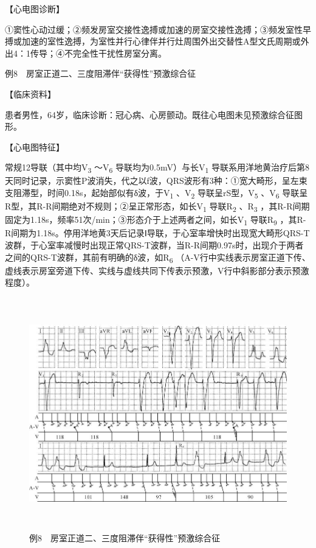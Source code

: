 【心电图诊断】

①窦性心动过缓；②频发房室交接性逸搏或加速的房室交接性逸搏；③频发室性早搏或加速的室性逸搏，为室性并行心律伴并行灶周围外出交替性A型文氏周期或外出4：1传导；④不完全性干扰性房室分离。

例8　房室正道二、三度阻滞伴“获得性”预激综合征

【临床资料】

患者男性，64岁，临床诊断：冠心病、心房颤动。既往心电图未见预激综合征图形。

【心电图特征】

常规12导联（其中均V\textsubscript{3} ～V\textsubscript{6}
导联均为0.5mV）与长V\textsubscript{1}
导联系用洋地黄治疗后第8天同时记录，示窦性P波消失，代之以f波，QRS波形有3种：①宽大畸形，呈左束支阻滞型，时间0.18s，起始部似有δ波，于V\textsubscript{1}
、V\textsubscript{2} 导联呈rS型，V\textsubscript{5} 、V\textsubscript{6}
导联呈R型，其R-R间期绝对不规则；②呈正常形态，如长V\textsubscript{1}
导联R\textsubscript{2} 、R\textsubscript{3}
，其R-R间期固定为1.18s，频率51次/min；③形态介于上述两者之间，如长V\textsubscript{1}
导联R\textsubscript{9}
，其R-R间期为1.18s。停用洋地黄3天后记录Ⅰ导联，于心室率增快时出现宽大畸形QRS-T波群，于心室率减慢时出现正常QRS-T波群，当R-R间期0.97s时，出现介于两者之间的QRS-T波群，其前有明确的δ波，如R\textsubscript{6}
（A-V行中实线表示房室正道下传、虚线表示房室旁道下传、实线与虚线共同下传表示预激，V行中斜影部分表示预激程度）。

\begin{figure}[!htbp]
 \centering
 \includegraphics[width=5.78125in,height=3.96875in]{./images/Image00766.jpg}
 \captionsetup{justification=centering}
 \caption{例8　房室正道二、三度阻滞伴“获得性”预激综合征}
 \label{fig50-8}
  \end{figure} 

